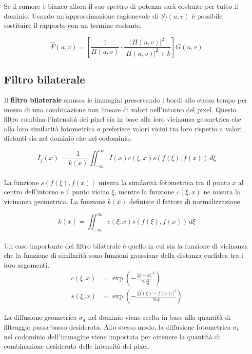\documentclass[../main.tex]{subfiles}
\begin{document}
Se il rumore è bianco allora il suo spettro di potenza sarà costante per tutto il dominio. Usando un'approssimazione ragionevole di $S_f(u,v)$ è possibile sostituire il rapporto con un termine costante.

\begin{equation}
	\hat{F}(u,v)= \left[\frac{1}{H(u,v)} \cdot \frac{\left|H(u,v)\right|^2}{\left|H(u,v)\right|^2+k}\right] G(u,v)
\end{equation}

\subsection{Filtro bilaterale}

Il \textbf{filtro bilaterale} smussa le immagini preservando i bordi allo stesso tempo per mezzo di una combinazione non lineare di valori nell'intorno del pixel. Questo filtro combina l'intensità dei pixel sia in base alla loro vicinanza geometrica che alla loro similarità fotometrica e preferisce valori vicini tra loro rispetto a valori distanti sia nel dominio che nel codominio.\cite{tomasi_1998}

\begin{equation}
	I_f(x) = \frac{1}{k(x)}\iint_{-\infty}^{\infty}I(x)c(\xi,x)s(f(\xi),f(x))\,d\xi
\end{equation}
\\[-10pt]
La funzione $s(f(\xi),f(x))$ misura la similarità fotometrica tra il punto $x$ al centro dell'intorno e il punto vicino $\xi$, mentre la funzione $c(\xi,x)$ ne misura la vicinanza geometrica. La funzione $k(x)$ definisce il fattore di normalizzazione.

\begin{equation}
	k(x) = \iint_{-\infty}^{\infty}c(\xi,x)s(f(\xi),f(x))\,d\xi
\end{equation}
\\[-10pt]
Un caso importante del filtro bilaterale è quello in cui sia la funzione di vicinanza che la funzione di similarità sono funzioni gaussiane della distanza euclidea tra i loro argomenti.
\begin{align}
	c(\xi,x) &= \exp\left(-\frac{||\xi-x||^2}{2\sigma^2_d}\right)\\
	s(\xi,x) &= \exp\left(-\frac{||f(\xi)-f(x)||^2}{2\sigma^2_r}\right)
\end{align}

La diffusione geometrica $\sigma_d$ nel dominio viene scelta in base alla quantità di filtraggio passa-basso desiderata. Allo stesso modo, la diffusione fotometrica $\sigma_r$ nel codominio dell'immagine viene impostata per ottenere la quantità di combinazione desiderata delle intensità dei pixel.
\end{document}
